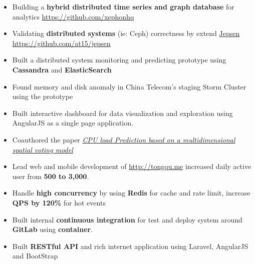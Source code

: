 \documentclass[10pt, letterpaper]{simple-cv}
\begin{document}
\begin{itemize}
\item Building a \textbf{hybrid distributed time series and graph database} for analytics \url{https://github.com/xephonhq}
\item Validating \textbf{distributed systems} (ie: Ceph) correctness by extend \href{http://jepsen.io/}{Jepsen} \url{https://github.com/at15/jepsen}
\end{itemize}

\begin{itemize}
\item Built a distributed system monitoring and predicting prototype using \textbf{Cassandra} and \textbf{ElasticSearch}
\item Found memory and disk anomaly in China Telecom's staging Storm Cluster using the prototype
\item Built interactive dashboard for data visualization and exploration using AngularJS as a single page application.
\item Coauthored the paper \textit{\href{https://at15.github.io/pub/cpu_load_prediction.pdf}{CPU load Prediction based on a multidimensional spatial voting model}}
\end{itemize}

\begin{itemize}
\item Lead web and mobile development of \url{http://tongqu.me} increased daily active user from \textbf{500 to 3,000}.
\item Handle \textbf{high concurrency} by using \textbf{Redis} for cache and rate limit, increase \textbf{QPS by 120\%} for hot events
\item Built internal \textbf{continuous integration} for test and deploy system around \textbf{GitLab} using \textbf{container}.
\item Built \textbf{RESTful API} and rich internet application using Laravel, AngularJS and BootStrap
\end{itemize}
\end{document}
